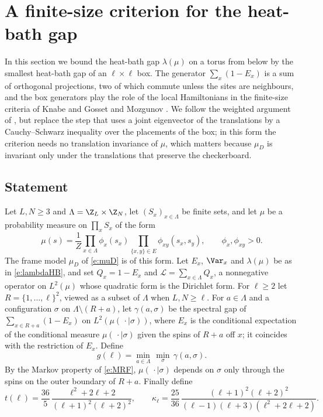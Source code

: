 \section{A finite-size criterion for the heat-bath gap}\label{s:knabe}

In this section we bound the heat-bath gap $\lambda(\mu)$ on a torus from below by the smallest heat-bath gap of an $\ell \times \ell$ box. The generator $\sum_x (1 - E_x)$ is a sum of orthogonal projections, two of which commute unless the sites are neighbours, and the box generators play the role of the local Hamiltonians in the finite-size criteria of Knabe \cite{Kna88} and Gosset and Mozgunov \cite{GM16}. We follow the weighted argument of \cite{GM16}, but replace the step that uses a joint eigenvector of the translations by a Cauchy--Schwarz inequality over the placements of the box; in this form the criterion needs no translation invariance of $\mu$, which matters because $\mu_D$ is invariant only under the translations that preserve the checkerboard.

\subsection{Statement}

Let $L, N \ge 3$ and $\Lambda = \Z_L \times \Z_N$, let $(S_x)_{x \in \Lambda}$ be finite sets, and let $\mu$ be a probability measure on $\prod_x S_x$ of the form
\begin{equation}\label{e:MRF}
\mu(s) = \frac{1}{Z} \prod_{x \in \Lambda} \phi_x(s_x) \prod_{\{x, y\} \in E} \phi_{xy}(s_x, s_y), \qquad \phi_x, \phi_{xy} > 0 .
\end{equation}
The frame model $\mu_D$ of \eqref{e:muD} is of this form. Let $E_x$, $\Var_x$ and $\lambda(\mu)$ be as in \eqref{e:lambdaHB}, and set $Q_x = 1 - E_x$ and $\mathcal L = \sum_{x \in \Lambda} Q_x$, a nonnegative operator on $L^2(\mu)$ whose quadratic form is the Dirichlet form. For $\ell \ge 2$ let $R = \{1, \dots, \ell\}^2$, viewed as a subset of $\Lambda$ when $L, N \ge \ell$. For $a \in \Lambda$ and a configuration $\sigma$ on $\Lambda \setminus (R + a)$, let $\gamma(a, \sigma)$ be the spectral gap of $\sum_{x \in R + a} (1 - E_x)$ on $L^2(\mu(\, \cdot \mid \sigma))$, where $E_x$ is the conditional expectation of the conditional measure $\mu(\, \cdot \mid \sigma)$ given the spins of $R + a$ off $x$; it coincides with the restriction of $E_x$. Define
\begin{equation}\label{e:gell}
g(\ell) = \min_{a \in \Lambda} \, \min_{\sigma} \, \gamma(a, \sigma) .
\end{equation}
By the Markov property of \eqref{e:MRF}, $\mu(\, \cdot \mid \sigma)$ depends on $\sigma$ only through the spins on the outer boundary of $R + a$. Finally define
\begin{equation}\label{e:tkappa}
t(\ell) = \frac{36}{5} \, \frac{\ell^2 + 2 \ell + 2}{(\ell + 1)^2 (\ell + 2)^2}, \qquad \kappa_\ell = \frac{25}{36} \, \frac{(\ell + 1)^2 (\ell + 2)^2}{(\ell - 1)(\ell + 3)(\ell^2 + 2 \ell + 2)} .
\end{equation}

